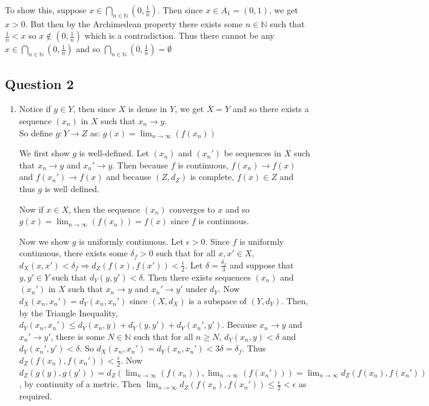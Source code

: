 \documentclass[letterpaper, 11pt]{article}
\newcommand{\N}{\mathbb{N}}   %
\newcommand{\1}{\mathds{1}}	%
\theoremstyle{definition}
\begin{document}
\begin{enumerate}[label=(\alph*)]
To show this, suppose $x \in \bigcap \limits _{n \in \N} (0,\frac{1}{n})$. Then since $x \in A_1 = (0,1)$, we get $x > 0$. But then by the Archimedean property there exists some $n \in \N$ such that $\frac{1}{n} < x$ so $x \notin (0, \frac{1}{n})$ which is a contradiction. Thus there cannot be any $x \in \bigcap \limits _{n \in \N} (0,\frac{1}{n})$ and so $\bigcap \limits _{n \in \N} (0,\frac{1}{n}) = \emptyset$

\end{enumerate}
\newpage
\subsection*{Question 2}

\begin{enumerate}[label=(\alph*)]

\item Notice if $y \in Y$, then since $X$ is dense in $Y$, we get $\overline{X} = Y$ and so there exists a sequence $(x_n)$ in $X$ such that $x_n \to y$. \\ So define $g:Y \to Z$ as: $g(x) = \lim _{n \to \infty} (f(x_n)) $

We first show $g$ is well-defined. Let $(x_n)$ and $(x_n')$ be sequences in $X$ such that $x_n \to y$ and $x_n' \to y$. Then because $f$ is continuous, $f(x_n) \to f(x)$ and $f(x_n') \to f(x)$ and because $(Z,d_Z)$ is complete, $f(x) \in Z$ and thus $g$ is well defined. 

Now if $x \in X$, then the sequence $(x_n)$ converges to $x$ and so $g(x) = \lim _{n \to \infty} (f(x_n)) = f(x)$ since $f$ is continuous. 

Now we show $g$ is uniformly continuous. Let $\epsilon > 0$. Since $f$ is uniformly continuous, there exists some $\delta _f > 0$ such that for all $x, x' \in X$, $d_X(x, x') < \delta _f \Rightarrow d_Z(f(x), f(x')) < \frac{\epsilon}{2}$. Let $\delta = \frac{\delta_f}{3}$ and suppose that $y, y' \in Y$ such that $d_Y(y, y') < \delta$. Then there exists sequences $(x_n)$ and $(x_n')$ in $X$ such that $x_n \to y$ and $x_n' \to y'$ under $d_Y$. Now $d_X (x_n, x_n ') = d_Y(x_n, x_n')$ since $(X, d_X)$ is a subspace of $(Y, d_Y)$. Then, by the Triangle Inequality, $d_Y (x_n, x_n') \le d_Y (x_n, y) + d_Y (y, y') + d_Y(x_n', y')$. Because $x_n \to y$ and $x_n' \to y'$, there is some $N \in \N$ such that for all $n \ge N$, $d_Y (x_n, y) < \delta$ and $d_Y (x_n ' , y') < \delta$. So $d_X (x_n, x_n') = d_Y (x_n, x_n') < 3\delta = \delta _f$. Thus $d_Z(f(x_n), f(x_n')) < \frac{\epsilon}{2}$. Now $d_Z(g(y), g(y')) = d_Z(\lim _{n \to \infty}(f(x_n)), \lim _{n \to \infty} (f(x_n'))) = \lim _{n \to \infty}d_Z(f(x_n), f(x_n'))$, by continuity of a metric. Then $\lim _{n \to \infty}d_Z(f(x_n), f(x_n')) \le \frac{\epsilon}{2} < \epsilon$ as required.



\end{enumerate}
\end{document}

